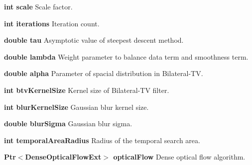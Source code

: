 \begin{DoxyItemize}
\item {\bfseries int scale} Scale factor.
\item {\bfseries int iterations} Iteration count.
\item {\bfseries double tau} Asymptotic value of steepest descent method.
\item {\bfseries double lambda} Weight parameter to balance data term and smoothness term.
\item {\bfseries double alpha} Parameter of spacial distribution in Bilateral-\/\+TV.
\item {\bfseries int btv\+Kernel\+Size} Kernel size of Bilateral-\/\+TV filter.
\item {\bfseries int blur\+Kernel\+Size} Gaussian blur kernel size.
\item {\bfseries double blur\+Sigma} Gaussian blur sigma.
\item {\bfseries int temporal\+Area\+Radius} Radius of the temporal search area.
\item {\bfseries Ptr$<$Dense\+Optical\+Flow\+Ext$>$ optical\+Flow} Dense optical flow algorithm. 
\end{DoxyItemize}